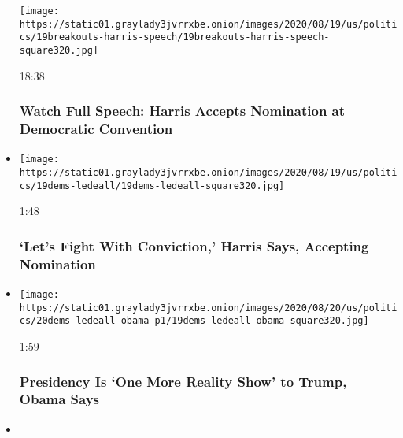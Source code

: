\begin{itemize}
  \texttt{[image: https://static01.graylady3jvrrxbe.onion/images/2020/08/19/us/politics/19breakouts-harris-speech/19breakouts-harris-speech-square320.jpg]}

  18:38

  \hypertarget{watch-full-speech-harris-accepts-nomination-at-democratic-convention}{%
  \subsubsection{Watch Full Speech: Harris Accepts Nomination at
  Democratic
  Convention}\label{watch-full-speech-harris-accepts-nomination-at-democratic-convention}}
\item
  \href{https://www.nytimes3xbfgragh.onion/video/us/elections/100000007297621/kamala-harris-speaks-dnc.html?action=click\&module=video-series-bar\&region=header\&pgtype=Article\&playlistId=video/2020-Elections}{}

  \texttt{[image: https://static01.graylady3jvrrxbe.onion/images/2020/08/19/us/politics/19dems-ledeall/19dems-ledeall-square320.jpg]}

  1:48

  \hypertarget{lets-fight-with-conviction-harris-says-accepting-nomination}{%
  \subsubsection{`Let's Fight With Conviction,' Harris Says, Accepting
  Nomination}\label{lets-fight-with-conviction-harris-says-accepting-nomination}}
\item
  \href{https://www.nytimes3xbfgragh.onion/video/us/elections/100000007297589/barack-obama-speaks-dnc.html?action=click\&module=video-series-bar\&region=header\&pgtype=Article\&playlistId=video/2020-Elections}{}

  \texttt{[image: https://static01.graylady3jvrrxbe.onion/images/2020/08/20/us/politics/20dems-ledeall-obama-p1/19dems-ledeall-obama-square320.jpg]}

  1:59

  \hypertarget{presidency-is-one-more-reality-show-to-trump-obama-says}{%
  \subsubsection{Presidency Is `One More Reality Show' to Trump, Obama
  Says}\label{presidency-is-one-more-reality-show-to-trump-obama-says}}
\item
  \href{https://www.nytimes3xbfgragh.onion/video/us/elections/100000007297591/elizabeth-warren-speaks-dnc.html?action=click\&module=video-series-bar\&region=header\&pgtype=Article\&playlistId=video/2020-Elections}{}


\end{itemize}
